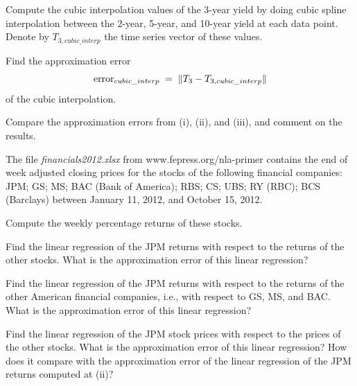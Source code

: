 \begin{exercises}
\begin{subparts}
\item Compute the cubic interpolation values of the 3-year yield by doing cubic spline
interpolation between the 2-year, 5-year, and 10-year yield at each data point. Denote
by $T_{3,cubic\_interp}$ the time series vector of these values.

Find the approximation error
\[
\text{error}_{cubic\_interp} \;=\; \left\|T_3 - T_{3,cubic\_interp}\right\|
\]
of the cubic interpolation.

\item Compare the approximation errors from (i), (ii), and (iii), and comment on the
results.
\end{subparts}

\item The file \emph{financials2012.xlsx} from www.fepress.org/nla-primer contains the
end of week adjusted closing prices for the stocks of the following financial
companies: JPM; GS; MS; BAC (Bank of America); RBS; CS; UBS; RY (RBC); BCS (Barclays)
between January 11, 2012, and October 15, 2012.

\begin{subparts}
\item Compute the weekly percentage returns of these stocks.
\item Find the linear regression of the JPM returns with respect to the returns of the
other stocks. What is the approximation error of this linear regression?
\item Find the linear regression of the JPM returns with respect to the returns of the
other American financial companies, i.e., with respect to GS, MS, and BAC. What is the
approximation error of this linear regression?
\item Find the linear regression of the JPM stock prices with respect to the prices of
the other stocks. What is the approximation error of this linear regression? How does
it compare with the approximation error of the linear regression of the JPM returns
computed at (ii)?
\end{subparts}

\end{exercises}
